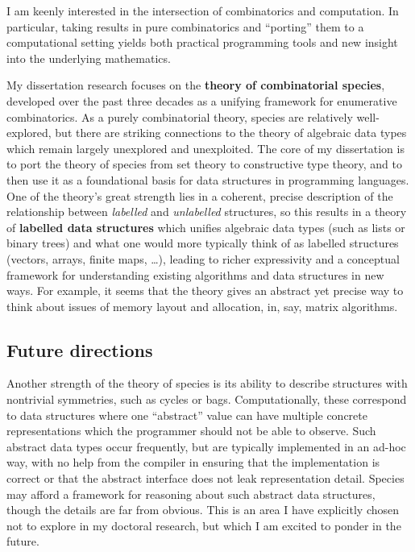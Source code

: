 \documentclass[12pt]{article}
\begin{document}
I am keenly interested in the intersection of combinatorics and
computation.  In particular, taking results in pure combinatorics and
``porting'' them to a computational setting yields both practical
programming tools and new insight into the underlying mathematics.

My dissertation research focuses on the \textbf{theory of
  combinatorial species}, developed over the past three decades as a
unifying framework for enumerative combinatorics. As a purely
combinatorial theory, species are relatively well-explored, but there
are striking connections to the theory of algebraic data types which
remain largely unexplored and unexploited.  The core of my
dissertation is to port the theory of species from set theory to
constructive type theory, and to then use it as a foundational basis
for data structures in programming languages. One of the theory's
great strength lies in a coherent, precise description of the
relationship between \emph{labelled} and \emph{unlabelled} structures,
so this results in a theory of \textbf{labelled data structures} which
unifies algebraic data types (such as lists or binary trees) and what
one would more typically think of as labelled structures (vectors,
arrays, finite maps, \dots), leading to richer expressivity and a
conceptual framework for understanding existing algorithms and data
structures in new ways.  For example, it seems that the theory gives
an abstract yet precise way to think about issues of memory layout and
allocation, in, say, matrix algorithms.

\subsection*{Future directions}

Another strength of the theory of species is its ability to describe
structures with nontrivial symmetries, such as cycles or bags.
Computationally, these correspond to data structures where one
``abstract'' value can have multiple concrete representations which
the programmer should not be able to observe.  Such abstract data
types occur frequently, but are typically implemented in an ad-hoc
way, with no help from the compiler in ensuring that the
implementation is correct or that the abstract interface does not leak
representation detail.  Species may afford a framework for reasoning
about such abstract data structures, though the details are far from
obvious.  This is an area I have explicitly chosen not to explore in
my doctoral research, but which I am excited to ponder in the future.
\end{document}
